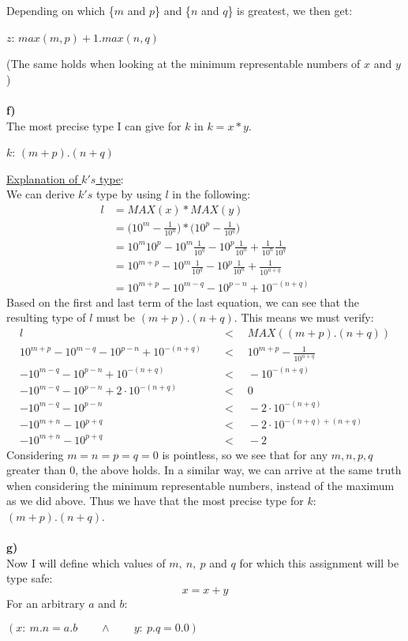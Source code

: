 Depending on which \{$m$ and $p$\} and \{$n$ and $q$\} is greatest, we then get:
\begin{center}
  $z$: $max(m,p)+1.max(n,q)$
\end{center}
(The same holds when looking at the minimum representable numbers of $x$ and $y$)\\
\\
\textbf{f)}\\
The most precise type I can give for $k$ in $k= x*y$.
\begin{center}
  $k$: $(m+p).(n+q)$
\end{center}
\underline{Explanation of $k's$ type}:\\
We can derive $k's$ type by using $l$ in the following:
\begin{align*}
  l &= MAX(x) * MAX(y)\\
    &= \Big(10^m - \frac{1}{10^n}\Big) * \Big(10^p - \frac{1}{10^q}\Big)\\
    &= 10^m10^p - 10^m\frac{1}{10^q} - 10^p\frac{1}{10^n} +  \frac{1}{10^n}\frac{1}{10^q}\\
    &= 10^{m+p} - 10^m\frac{1}{10^q} - 10^p\frac{1}{10^n} +  \frac{1}{10^{n+q}}\\
    &= 10^{m+p} - 10^{m-q} - 10^{p-n} + 10^{-(n+q)}
\end{align*}
Based on the first and last term of the last equation, we can see that the resulting type of $l$ must be $(m+p).(n+q)$. This means we must verify:
\begin{align*}
  l \quad &< \quad MAX( (m+p).(n+q))\\
  10^{m+p} - 10^{m-q} - 10^{p-n} + 10^{-(n+q)} \quad  &< \quad 10^{m+p} - \frac{1}{10^{n+q}} \\
  - 10^{m-q} - 10^{p-n} + 10^{-(n+q)} \quad  &< \quad - 10^{-(n+q)} \\
  - 10^{m-q} - 10^{p-n} + 2 \cdot 10^{-(n+q)} \quad  &< \quad 0\\
  - 10^{m-q} - 10^{p-n} \quad  &< \quad  - 2 \cdot 10^{-(n+q)}\\
  - 10^{m+n} - 10^{p+q} \quad  &< \quad  - 2 \cdot 10^{-(n+q)+(n+q)}\\
  - 10^{m+n} - 10^{p+q} \quad  &< \quad  - 2
\end{align*}
Considering $m=n=p=q=0$ is pointless, so we see that for any $m,n,p,q$ greater than 0, the above holds. In a similar way, we can arrive at the same truth when considering the minimum representable numbers, instead of the maximum as we did above. Thus we have that the most precise type for $k$: $(m+p).(n+q)$.\\
\\
\textbf{g)}\\
Now I will define which values of $m,\ n,\ p$ and $q$ for which this assignment will be type safe:
$$
  x = x + y
$$
For an arbitrary $a$ and $b$:
\begin{center}
  $(x:\ m.n = a.b \qquad  \wedge \qquad y:\ p.q = 0.0)$
\end{center}

